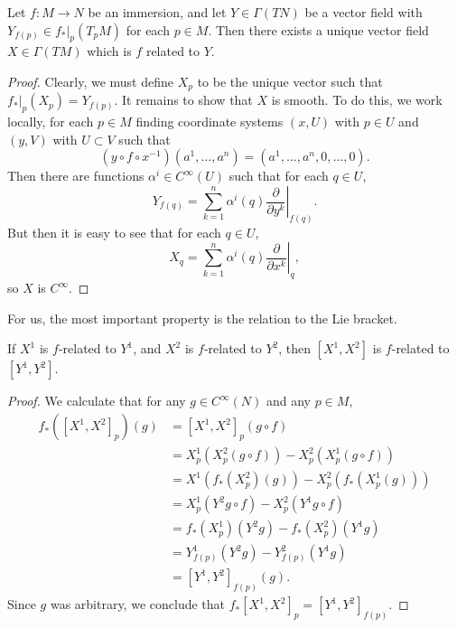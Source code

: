 \begin{lemma}
    Let $f: M \to N$ be an immersion, and let $Y \in \Gamma(TN)$ be a vector field with $Y_{f(p)} \in f_*|_p(T_pM)$ for each $p \in M$. Then there exists a unique vector field $X \in \Gamma(TM)$ which is $f$ related to $Y$.
\end{lemma}
\begin{proof}
    Clearly, we must define $X_p$ to be the unique vector such that $f_*|_p(X_p) = Y_{f(p)}$. It remains to show that $X$ is smooth. To do this, we work locally, for each $p \in M$ finding coordinate systems $(x,U)$ with $p \in U$ and $(y,V)$ with $U \subset V$ such that
    \[ (y \circ f \circ x^{-1})(a^1,\dots,a^n) = (a^1,\dots,a^n,0,\dots,0). \]
    Then there are functions $\alpha^i \in C^\infty(U)$ such that for each $q \in U$,
    \[ Y_{f(q)} = \sum_{k = 1}^n \alpha^i(q) \left. \frac{\partial}{\partial y^k} \right|_{f(q)}. \]
    But then it is easy to see that for each $q \in U$,
    \[ X_q = \sum_{k = 1}^n \alpha^i(q) \left. \frac{\partial}{\partial x^k} \right|_q, \]
    so $X$ is $C^\infty$.
\end{proof}

For us, the most important property is the relation to the Lie bracket.

\begin{theorem}
    If $X^1$ is $f$-related to $Y^1$, and $X^2$ is $f$-related to $Y^2$, then $[X^1,X^2]$ is $f$-related to $[Y^1,Y^2]$.
\end{theorem}
\begin{proof}
    We calculate that for any $g \in C^\infty(N)$ and any $p \in M$,
    \begin{align*}
        f_*([X^1,X^2]_p)(g) &= [X^1,X^2]_p(g \circ f)\\
        &= X^1_p(X^2_p(g \circ f)) - X^2_p(X^1_p(g \circ f))\\
        &= X^1(f_*(X^2_p)(g)) - X^2_p(f_*(X^1_p(g)))\\
        &= X^1_p(Y^2g \circ f) - X^2_p(Y^1g \circ f)\\
        &= f_*(X^1_p)(Y^2 g) - f_*(X^2_p)(Y^1g)\\
        &= Y^1_{f(p)}(Y^2 g) - Y^2_{f(p)}(Y^1 g)\\
        &= [Y^1,Y^2]_{f(p)}(g).
    \end{align*}
    Since $g$ was arbitrary, we conclude that $f_*[X^1,X^2]_p = [Y^1,Y^2]_{f(p)}$.
\end{proof}

